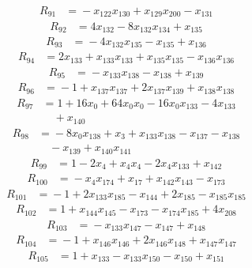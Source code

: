 \begin{align*}
R_{91}&={}-x_{122}x_{130} +x_{129}x_{200} -x_{131}
\end{align*}
\begin{align*}
R_{92}&={}4x_{132} -8x_{132}x_{134} +x_{135}
\end{align*}
\begin{align*}
R_{93}&={}-4x_{132}x_{135} -x_{135} +x_{136}
\end{align*}
\begin{align*}
R_{94}&={}2x_{133} +x_{133}x_{133} +x_{135}x_{135} -x_{136}x_{136}
\end{align*}
\begin{align*}
R_{95}&={}-x_{133}x_{138} -x_{138} +x_{139}
\end{align*}
\begin{align*}
R_{96}&={}-1 +x_{137}x_{137} +2x_{137}x_{139} +x_{138}x_{138}
\end{align*}
\begin{align*}
R_{97}&={}1 +16x_{0} +64x_{0}x_{0} -16x_{0}x_{133} -4x_{133}\\
&\quad{}+x_{140}
\end{align*}
\begin{align*}
R_{98}&={}-8x_{0}x_{138} +x_{3} +x_{133}x_{138} -x_{137} -x_{138}\\
&\quad{}-x_{139} +x_{140}x_{141}
\end{align*}
\begin{align*}
R_{99}&={}1 -2x_{4} +x_{4}x_{4} -2x_{4}x_{133} +x_{142}
\end{align*}
\begin{align*}
R_{100}&={}-x_{4}x_{174} +x_{17} +x_{142}x_{143} -x_{173}
\end{align*}
\begin{align*}
R_{101}&={}-1 +2x_{133}x_{185} -x_{144} +2x_{185} -x_{185}x_{185}
\end{align*}
\begin{align*}
R_{102}&={}1 +x_{144}x_{145} -x_{173} -x_{174}x_{185} +4x_{208}
\end{align*}
\begin{align*}
R_{103}&={}-x_{133}x_{147} -x_{147} +x_{148}
\end{align*}
\begin{align*}
R_{104}&={}-1 +x_{146}x_{146} +2x_{146}x_{148} +x_{147}x_{147}
\end{align*}
\begin{align*}
R_{105}&={}1 +x_{133} -x_{133}x_{150} -x_{150} +x_{151}
\end{align*}

